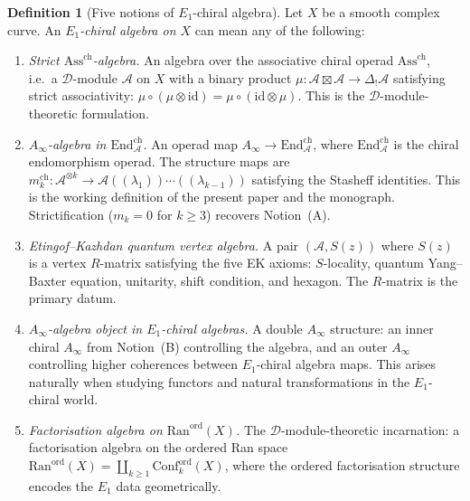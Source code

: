 \documentclass[11pt,reqno]{amsart}
\theoremstyle{definition}
\newtheorem{definition}[theorem]{Definition}
\theoremstyle{remark}
\providecommand{\cA}{\mathcal{A}}
\providecommand{\cD}{\mathcal{D}}
\providecommand{\Ran}{\mathrm{Ran}}
\providecommand{\Conf}{\mathrm{Conf}}
\providecommand{\Ainf}{A_\infty}
\providecommand{\Eone}{E_1}
\providecommand{\id}{\mathrm{id}}
\providecommand{\End}{\mathrm{End}}
\providecommand{\chirAss}{\mathrm{Ass}^{\mathrm{ch}}}
\begin{document}
\begin{definition}[Five notions of $\Eone$-chiral algebra]
\label{def:e-five-notions}
Let $X$ be a smooth complex curve. An \emph{$\Eone$-chiral
algebra on $X$} can mean any of the following:
\begin{enumerate}[label=\textup{(\Alph*)}]
\item \emph{Strict $\chirAss$-algebra.}
 An algebra over the associative chiral operad
 $\chirAss$, i.e.\ a $\cD$-module $\cA$ on $X$ with a
 binary product
 $\mu \colon \cA \boxtimes \cA \to \Delta_!\cA$
 satisfying strict associativity:
 $\mu \circ (\mu \otimes \id) = \mu \circ (\id \otimes \mu)$.
 This is the $\cD$-module-theoretic formulation.

\item \emph{$\Ainf$-algebra in $\End^{\mathrm{ch}}_\cA$.}
 An operad map
 $\Ainf \to \End^{\mathrm{ch}}_\cA$, where
 $\End^{\mathrm{ch}}_\cA$ is the chiral endomorphism operad.
 The structure maps are
 $m_k^{\mathrm{ch}} \colon
 \cA^{\otimes k} \to
 \cA((\lambda_1))\cdots((\lambda_{k-1}))$
 satisfying the Stasheff identities. This is the working
 definition of the present paper and the monograph.
 Strictification ($m_k = 0$ for $k \ge 3$) recovers
 Notion~(A).

\item \emph{Etingof--Kazhdan quantum vertex algebra.}
 A pair $(\cA, S(z))$ where $S(z)$ is a vertex $R$-matrix
 satisfying the five EK axioms: $S$-locality, quantum
 Yang--Baxter equation, unitarity, shift condition, and
 hexagon. The $R$-matrix is the primary datum.

\item \emph{$\Ainf$-algebra object in $\Eone$-chiral algebras.}
 A double $\Ainf$ structure: an inner chiral $\Ainf$ from
 Notion~(B) controlling the algebra, and an outer $\Ainf$
 controlling higher coherences between $\Eone$-chiral
 algebra maps. This arises naturally when studying functors
 and natural transformations in the $\Eone$-chiral world.

\item \emph{Factorisation algebra on
 $\Ran^{\mathrm{ord}}(X)$.}
 The $\cD$-module-theoretic incarnation: a factorisation
 algebra on the ordered Ran space
 $\Ran^{\mathrm{ord}}(X) = \coprod_{k \ge 1}
 \Conf_k^{\mathrm{ord}}(X)$, where the ordered
 factorisation structure encodes the $\Eone$ data
 geometrically.
\end{enumerate}
\end{definition}
\end{document}
